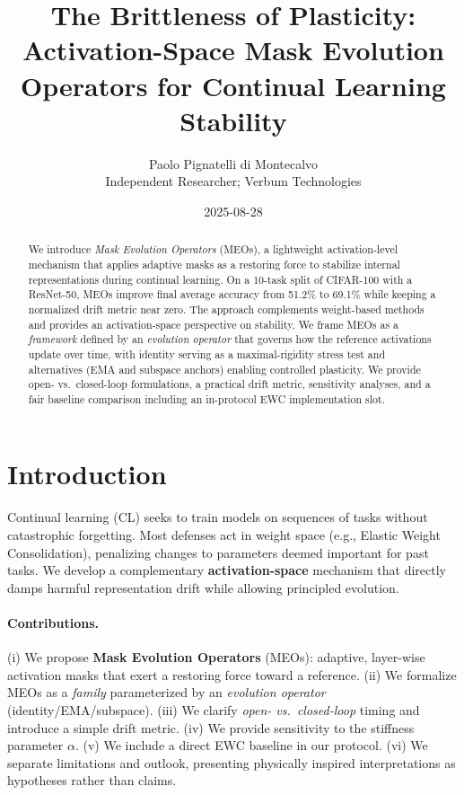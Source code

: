 \documentclass[11pt]{article}
\title{The Brittleness of Plasticity: Activation-Space Mask Evolution Operators for Continual Learning Stability}
\author{Paolo Pignatelli di Montecalvo \\ Independent Researcher; Verbum Technologies}
\date{2025-08-28}
\begin{document}
\maketitle

\begin{abstract}
We introduce \emph{Mask Evolution Operators} (MEOs), a lightweight activation-level mechanism that applies adaptive masks as a restoring force to stabilize internal representations during continual learning. On a 10-task split of CIFAR-100 with a ResNet-50, MEOs improve final average accuracy from 51.2\% to 69.1\% while keeping a normalized drift metric near zero. The approach complements weight-based methods and provides an activation-space perspective on stability. We frame MEOs as a \emph{framework} defined by an \emph{evolution operator} that governs how the reference activations update over time, with identity serving as a maximal-rigidity stress test and alternatives (EMA and subspace anchors) enabling controlled plasticity. We provide open- vs.\ closed-loop formulations, a practical drift metric, sensitivity analyses, and a fair baseline comparison including an in-protocol EWC implementation slot.
\end{abstract}

\section{Introduction}
Continual learning (CL) seeks to train models on sequences of tasks without catastrophic forgetting. Most defenses act in weight space (e.g., Elastic Weight Consolidation), penalizing changes to parameters deemed important for past tasks. We develop a complementary \textbf{activation-space} mechanism that directly damps harmful representation drift while allowing principled evolution.

\paragraph{Contributions.} (i) We propose \textbf{Mask Evolution Operators} (MEOs): adaptive, layer-wise activation masks that exert a restoring force toward a reference. (ii) We formalize MEOs as a \emph{family} parameterized by an \emph{evolution operator} (identity/EMA/subspace). (iii) We clarify \emph{open- vs.\ closed-loop} timing and introduce a simple drift metric. (iv) We provide sensitivity to the stiffness parameter $\alpha$. (v) We include a direct EWC baseline in our protocol. (vi) We separate limitations and outlook, presenting physically inspired interpretations as hypotheses rather than claims.
\end{document}
